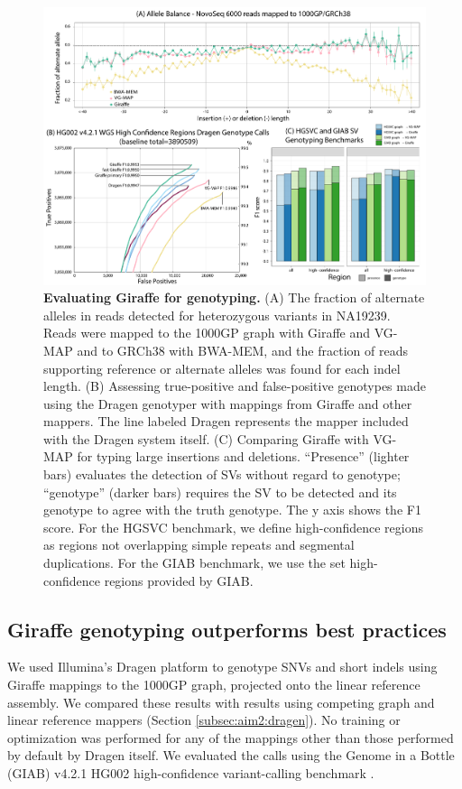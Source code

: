 \documentclass[11pt]{ucscthesis}
\begin{document}
\begin{figure}
    \centering
    \includegraphics[width=\linewidth]{aim2_fig4.pdf}
    \caption[Evaluating Giraffe for genotyping]{\textbf{Evaluating Giraffe for genotyping.} (A) The fraction of alternate alleles in reads detected for heterozygous variants in NA19239. Reads were mapped to the 1000GP graph with Giraffe and VG-MAP and to GRCh38 with BWA-MEM, and the fraction of reads supporting reference or alternate alleles was found for each indel length. (B) Assessing true-positive and false-positive genotypes made using the Dragen genotyper with mappings from Giraffe and other mappers. The line labeled Dragen represents the mapper included with the Dragen system itself. (C) Comparing Giraffe with VG-MAP for typing large insertions and deletions. “Presence” (lighter bars) evaluates the detection of SVs without regard to genotype; “genotype” (darker bars) requires the SV to be detected and its genotype to agree with the truth genotype. The y axis shows the F1 score. For the HGSVC benchmark, we define high-confidence regions as regions not overlapping simple repeats and segmental duplications. For the GIAB benchmark, we use the set high-confidence regions provided by GIAB.}
    \label{fig:aim2_fig4}
\end{figure}

\subsection{Giraffe genotyping outperforms best practices}
We used Illumina’s Dragen platform \cite{illumina_dragen_2019} to genotype SNVs and short indels using Giraffe mappings to the 1000GP graph, projected onto the linear reference assembly.
We compared these results with results using competing graph and linear reference mappers (Section \ref{subsec:aim2:dragen}).
No training or optimization was performed for any of the mappings other than those performed by default by Dragen itself. We evaluated the calls using the Genome in a Bottle (GIAB) v4.2.1 HG002 high-confidence variant-calling benchmark \cite{wagner_benchmarking_2020}.
\end{document}
